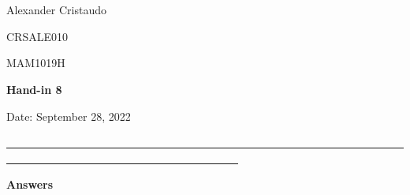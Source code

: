 \documentclass[12pt, a4paper]{exam}
\begin{document}
	\noindent
	\begin{minipage}[l]{0.1\textwidth}
		\noindent
	\end{minipage}
\hfill
\begin{minipage}[c]{1.0\textwidth} %
	\begin{center}
		
		{
		\large \ \ \par
		\large \ \ \par
		\large  Alexander Cristaudo \par
		\small	CRSALE010	\par
		\large	MAM1019H	\par
	\large \textbf{Hand-in 8}	\par
\small	Date: September 28, 2022}
	\end{center}
\end{minipage}
\par
\vspace{0.2in}
\noindent
\uline{ \ \ \ \ \ \ \ \ \ \ \ \ \ \ \ \ \ \ \ \ \ \ \ \ \ \ \ \ \ \ \ \ \ \ \ \ \ \ \ \ \ \ \ \ \ \ \ \ \ \ \ \ \ \ \ \ \ \ \ \ \ \ \ \ \ \ \ \ \ \ \ \ \ \ \ \ \ \  \ \ \ \ \ \ \ \ \ \ \ \ \ \  \ \ \ \ \ \ \ \ \ \ \ \ \ \ \ \ \ \ \ \ \ \ }
\par 
\vspace{0.15in}
\noindent
\centering
{\small \bfseries 	Answers}
\end{document}
